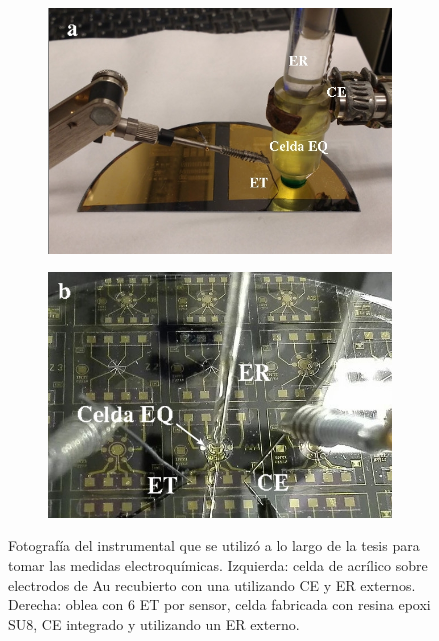 					 \begin{figure}[t!]
			  		 \begin{subfigure}[t]{0.495\textwidth}
			  		  \includegraphics[width=\textwidth]{Imagenes/EQ1.jpg}
			  		  \end{subfigure}
			  		  \begin{subfigure}[t]{0.495\textwidth}
			  		  \includegraphics[width=\textwidth]{Imagenes/EQ2.jpg}
			  		  \end{subfigure}
			  \caption[Equipo para realizar la medidas electroquímicas]{Fotografía del instrumental que se utilizó a lo largo de la tesis para tomar las medidas electroquímicas. Izquierda: celda de acrílico sobre electrodos de Au recubierto con una \pdm\space utilizando CE y ER externos. Derecha: oblea con 6 ET por sensor, celda fabricada con resina epoxi SU8, CE integrado y utilizando un ER externo.}
			  		 \label{fig:celda}
			 		 \end{figure}

